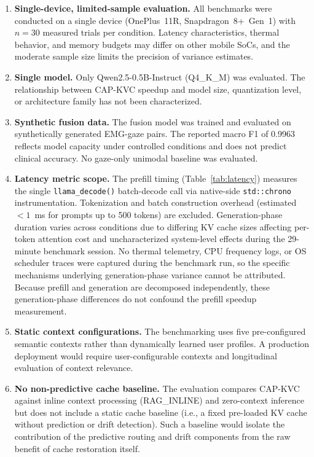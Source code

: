 \documentclass[journal]{IEEEtran}
\begin{document}
\begin{enumerate}
    \item \textbf{Single-device, limited-sample evaluation.} All benchmarks were conducted on a single device (OnePlus~11R, Snapdragon~8+~Gen~1) with $n = 30$ measured trials per condition. Latency characteristics, thermal behavior, and memory budgets may differ on other mobile SoCs, and the moderate sample size limits the precision of variance estimates.

    \item \textbf{Single model.} Only Qwen2.5-0.5B-Instruct (Q4\_K\_M) was evaluated. The relationship between CAP-KVC speedup and model size, quantization level, or architecture family has not been characterized.

    \item \textbf{Synthetic fusion data.} The fusion model was trained and evaluated on synthetically generated EMG-gaze pairs. The reported macro F1 of 0.9963 reflects model capacity under controlled conditions and does not predict clinical accuracy. No gaze-only unimodal baseline was evaluated.

    \item \textbf{Latency metric scope.} The prefill timing (Table~\ref{tab:latency}) measures the single \texttt{llama\_decode()} batch-decode call via native-side \texttt{std::chrono} instrumentation. Tokenization and batch construction overhead (estimated $< 1$~ms for prompts up to 500 tokens) are excluded. Generation-phase duration varies across conditions due to differing KV cache sizes affecting per-token attention cost and uncharacterized system-level effects during the 29-minute benchmark session. No thermal telemetry, CPU frequency logs, or OS scheduler traces were captured during the benchmark run, so the specific mechanisms underlying generation-phase variance cannot be attributed. Because prefill and generation are decomposed independently, these generation-phase differences do not confound the prefill speedup measurement.

    \item \textbf{Static context configurations.} The benchmarking uses five pre-configured semantic contexts rather than dynamically learned user profiles. A production deployment would require user-configurable contexts and longitudinal evaluation of context relevance.

    \item \textbf{No non-predictive cache baseline.} The evaluation compares CAP-KVC against inline context processing (RAG\_INLINE) and zero-context inference but does not include a static cache baseline (i.e., a fixed pre-loaded KV cache without prediction or drift detection). Such a baseline would isolate the contribution of the predictive routing and drift components from the raw benefit of cache restoration itself.


\end{enumerate}
\end{document}
